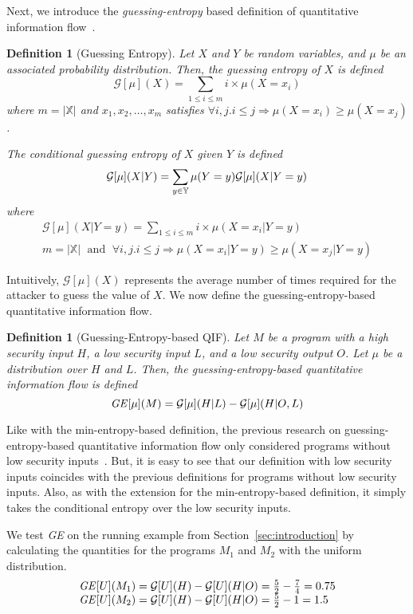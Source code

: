 \documentclass{llncs}
\newtheorem{definition}[theorem]{Definition}
\begin{document}
Next, we introduce the {\em guessing-entropy} based definition of
quantitative information
flow~\cite{Massey94,kopf07,DBLP:conf/sp/BackesKR09}.
\begin{definition}[Guessing Entropy]
Let $X$ and $Y$ be random variables, and $\mu$ be an associated probability
distribution.  Then, the guessing entropy of $X$ is defined
\[
\mathcal{G}[\mu](X)=\sum_{1\le i\le m}i\times\mu(X=x_i)
\]
where $m=|\mathbb{X}|$ and $x_1,x_2,\dots,x_{m}$ satisfies $\forall
i,j.i\le j\Rightarrow \mu(X=x_i)\ge\mu(X=x_j)$.

The conditional guessing entropy of $X$ given $Y$ is defined
\[
\mathcal{G}[\mu](X|Y)=\sum_{y\in{\mathbb Y}}\mu(Y=y)\mathcal{G}[\mu](X|Y=y)\\
\]
where
\[
\begin{array}{c}
\mathcal{G}[\mu](X|Y=y)=\sum_{1\le i\le m}i\times\mu(X=x_i|Y=y)\\
m=|\mathbb{X}|\;\textrm{ and }\;\forall
i,j.i\le j\Rightarrow \mu(X=x_i|Y=y)\ge\mu(X=x_j|Y=y)
\end{array}
\]
\end{definition}

Intuitively, $\mathcal{G}[\mu](X)$ represents the average number of
times required for the attacker to guess the value of $X$.  We now
define the guessing-entropy-based quantitative information flow.

\begin{definition}[Guessing-Entropy-based QIF]
\label{def:ge}
Let $M$ be a program with a high security input $H$, a low security input
$L$, and a low security output $O$.  Let $\mu$ be a distribution over
$H$ and $L$.  Then, the guessing-entropy-based quantitative
information flow is defined
\[
{\it GE}[\mu](M)=\mathcal{G}[\mu](H|L)-\mathcal{G}[\mu](H|O,L)
\]
\end{definition}

\begin{sloppypar}
Like with the min-entropy-based definition, the previous research on
guessing-entropy-based quantitative information flow only considered
programs without low security
inputs~\cite{kopf07,DBLP:conf/sp/BackesKR09}.  But, it is easy to see
that our definition with low security inputs coincides with the
previous definitions for programs without low security inputs.  Also,
as with the extension for the min-entropy-based definition, it simply
takes the conditional entropy over the low security inputs.
\end{sloppypar}

We test {\it GE} on the running example from
Section~\ref{sec:introduction} by calculating the quantities for the
programs $M_1$ and $M_2$ with the uniform distribution. 
\renewcommand{\arraystretch}{1.1}
\[
\begin{array}{l}
{\it GE}[U](M_1)  =\mathcal{G}[U](H)-\mathcal{G}[U](H|O)
=\frac{5}{2} - \frac{7}{4}
 = 0.75\\
{\it GE}[U](M_2) = \mathcal{G}[U](H)-\mathcal{G}[U](H|O)
=\frac{5}{2} - 1
 = 1.5
\end{array}
\]
\renewcommand{\arraystretch}{1.0}
\end{document}
